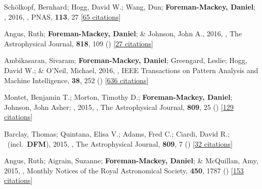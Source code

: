 \item[{\color{numcolor}\scriptsize16}] Sch{\"o}lkopf, Bernhard; Hogg, David W.; Wang, Dun; \textbf{Foreman-Mackey, Daniel}; \etal, 2016, , PNAS, \textbf{113}, 27 [\href{https://scholar.google.com/scholar?cites=2429561747341807338}{65 citations}]

\item[{\color{numcolor}\scriptsize15}] Angus, Ruth; \textbf{Foreman-Mackey, Daniel}; \& Johnson, John A., 2016, , The Astrophysical Journal, \textbf{818}, 109 () [\href{https://ui.adsabs.harvard.edu/abs/2016ApJ...818..109A}{27 citations}]

\item[{\color{numcolor}\scriptsize14}] Ambikasaran, Sivaram; \textbf{Foreman-Mackey, Daniel}; Greengard, Leslie; Hogg, David W.; \& O'Neil, Michael, 2016, , IEEE Transactions on Pattern Analysis and Machine Intelligence, \textbf{38}, 252 () [\href{https://scholar.google.com/scholar?cites=7122560326210979193,5194420368165307096,3347404430934682534}{636 citations}]

\item[{\color{numcolor}\scriptsize13}] Montet, Benjamin T.; Morton, Timothy D.; \textbf{Foreman-Mackey, Daniel}; Johnson, John Asher; \etal, 2015, , The Astrophysical Journal, \textbf{809}, 25 () [\href{https://ui.adsabs.harvard.edu/abs/2015ApJ...809...25M}{129 citations}]

\item[{\color{numcolor}\scriptsize12}] Barclay, Thomas; Quintana, Elisa V.; Adams, Fred C.; Ciardi, David R.; \etal\ (incl.\ \textbf{DFM}), 2015, , The Astrophysical Journal, \textbf{809}, 7 () [\href{https://ui.adsabs.harvard.edu/abs/2015ApJ...809....7B}{32 citations}]

\item[{\color{numcolor}\scriptsize11}] Angus, Ruth; Aigrain, Suzanne; \textbf{Foreman-Mackey, Daniel}; \& McQuillan, Amy, 2015, , Monthly Notices of the Royal Astronomical Society, \textbf{450}, 1787 () [\href{https://ui.adsabs.harvard.edu/abs/2015MNRAS.450.1787A}{153 citations}]

